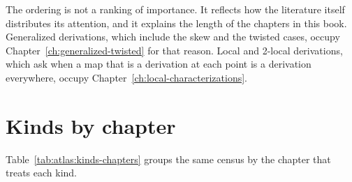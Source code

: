 The ordering is not a ranking of importance. %
It reflects how the literature itself distributes its attention, and it %
explains the length of the chapters in this book. %
Generalized derivations, which include the skew and the twisted cases, occupy %
Chapter~\ref{ch:generalized-twisted} for that reason. %
Local and 2-local derivations, which ask when a map that is a derivation at each %
point is a derivation everywhere, occupy %
Chapter~\ref{ch:local-characterizations}. %

\section{Kinds by chapter}

Table~\ref{tab:atlas:kinds-chapters} groups the same census by the chapter that %
treats each kind. %


